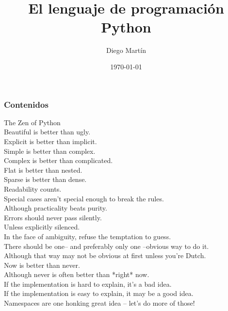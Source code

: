 \documentclass{beamer}
\title[Introducción a Python]{El lenguaje de programación Python} %
\author{Diego Martín} %
\institute[USAL] %
{
Universidad de Salamanca \\ %
\medskip
\textit{martinarroyo@usal.es} %
}
\date{\today} %
\begin{document}
\begin{frame}
\titlepage %
\end{frame}

\begin{frame}
\frametitle{Contenidos} %
\tableofcontents %
\end{frame}

\begin{frame}
\large The Zen of Python\\
\small{Beautiful is better than ugly.\\
    Explicit is better than implicit.\\
    Simple is better than complex.\\
    Complex is better than complicated.\\
    Flat is better than nested.\\
    Sparse is better than dense.\\
    Readability counts.\\
    Special cases aren't special enough to break the rules.\\
    Although practicality beats purity.\\
    Errors should never pass silently.\\
    Unless explicitly silenced.\\
    In the face of ambiguity, refuse the temptation to guess.\\
    There should be one-- and preferably only one --obvious way to do it.\\
    Although that way may not be obvious at first unless you're Dutch.\\
    Now is better than never.\\
    Although never is often better than *right* now.\\
    If the implementation is hard to explain, it's a bad idea.\\
    If the implementation is easy to explain, it may be a good idea.\\
    Namespaces are one honking great idea -- let's do more of those!\\} 
\end{frame}
\end{document}
